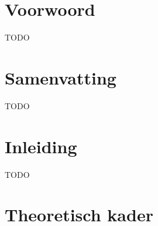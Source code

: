 \documentclass[a4paper,10pt,titlepage]{article}
\def\s{\section}                              %
\begin{document}



\newpage
\tableofcontents
\newpage
\s*{Voorwoord}

TODO

\newpage
\null\vspace{\fill}

\s*{\hfill Samenvatting \hfill}
\begin{center}
TODO
\end{center}
\vspace{\fill}
\newpage

\s{Inleiding}

TODO

\s{Theoretisch kader}
\end{document}
